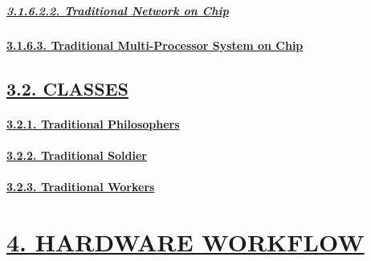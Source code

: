 \documentclass[
]{article}
\begin{document}
\hypertarget{traditional-network-on-chip}{%
\subparagraph{\texorpdfstring{\protect\hyperlink{traditional-network-on-chip-1}{3.1.6.2.2.
Traditional Network on
Chip}}{3.1.6.2.2. Traditional Network on Chip}}\label{traditional-network-on-chip}}

\hypertarget{traditional-multi-processor-system-on-chip}{%
\paragraph{\texorpdfstring{\protect\hyperlink{traditional-multi-processor-system-on-chip-1}{3.1.6.3.
Traditional Multi-Processor System on
Chip}}{3.1.6.3. Traditional Multi-Processor System on Chip}}\label{traditional-multi-processor-system-on-chip}}

\hypertarget{classes}{%
\subsection{\texorpdfstring{\protect\hyperlink{classes-1}{3.2.
CLASSES}}{3.2. CLASSES}}\label{classes}}

\hypertarget{traditional-philosophers}{%
\paragraph{\texorpdfstring{\protect\hyperlink{traditional-philosophers-1}{3.2.1.
Traditional
Philosophers}}{3.2.1. Traditional Philosophers}}\label{traditional-philosophers}}

\hypertarget{traditional-soldier}{%
\paragraph{\texorpdfstring{\protect\hyperlink{traditional-soldier-1}{3.2.2.
Traditional
Soldier}}{3.2.2. Traditional Soldier}}\label{traditional-soldier}}

\hypertarget{traditional-workers}{%
\paragraph{\texorpdfstring{\protect\hyperlink{traditional-workers-1}{3.2.3.
Traditional
Workers}}{3.2.3. Traditional Workers}}\label{traditional-workers}}

\hypertarget{hardware-workflow}{%
\section{\texorpdfstring{\protect\hyperlink{hardware-workflow-1}{4.
HARDWARE WORKFLOW}}{4. HARDWARE WORKFLOW}}\label{hardware-workflow}}
\end{document}
